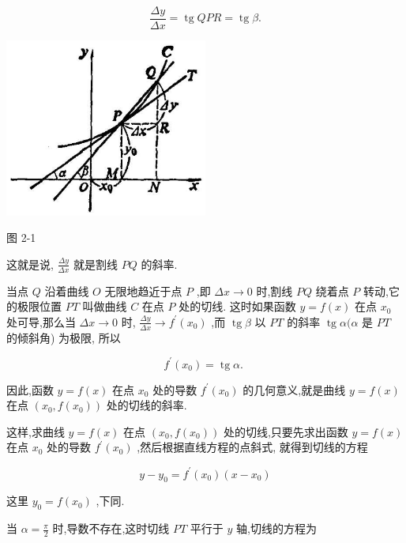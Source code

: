 \documentclass[10pt]{article}
\begin{document}
\[
\frac{\Delta y}{\Delta x} = \operatorname{tg}{QPR} = \operatorname{tg}\beta .
\]

\begin{center}
\includegraphics[max width=0.5\textwidth]{images/01912c18-5c3f-733d-b775-749ba9897a9d_62_329591.jpg}
\end{center}

图 2-1

这就是说, \(\frac{\Delta y}{\Delta x}\) 就是割线 \({PQ}\) 的斜率.

当点 \(Q\) 沿着曲线 \(O\) 无限地趋近于点 \(P\) ,即 \({\Delta x} \rightarrow 0\) 时,割线 \({PQ}\) 绕着点 \(P\) 转动,它的极限位置 \({PT}\) 叫做曲线 \(C\) 在点 \(P\) 处的切线. 这时如果函数 \(y = f\left( x\right)\) 在点 \({x}_{0}\) 处可导,那么当 \({\Delta x} \rightarrow 0\) 时, \(\frac{\Delta y}{\Delta x} \rightarrow {f}^{\prime }\left( {x}_{0}\right)\) ,而 \(\operatorname{tg}\beta\) 以 \({PT}\) 的斜率 \(\operatorname{tg}\alpha (\alpha\) 是 \({PT}\) 的倾斜角) 为极限, 所以

\[
{f}^{\prime }\left( {x}_{0}\right) = \operatorname{tg}\alpha \text{. }
\]

因此,函数 \(y = f\left( x\right)\) 在点 \({x}_{0}\) 处的导数 \({f}^{\prime }\left( {x}_{0}\right)\) 的几何意义,就是曲线 \(y = f\left( x\right)\) 在点 \(\left( {{x}_{0},f\left( {x}_{0}\right) }\right)\) 处的切线的斜率.

这样,求曲线 \(y = f\left( x\right)\) 在点 \(\left( {{x}_{0},f\left( {x}_{0}\right) }\right)\) 处的切线,只要先求出函数 \(y = f\left( x\right)\) 在点 \({x}_{0}\) 处的导数 \({f}^{\prime }\left( {x}_{0}\right)\) ,然后根据直线方程的点斜式, 就得到切线的方程

\[
y - {y}_{0} = {f}^{\prime }\left( {x}_{0}\right) \left( {x - {x}_{0}}\right)
\]

这里 \({y}_{0} = f\left( {x}_{0}\right)\) ,下同.

当 \(\alpha = \frac{\pi }{2}\) 时,导数不存在,这时切线 \({PT}\) 平行于 \(y\) 轴,切线的方程为
\end{document}

